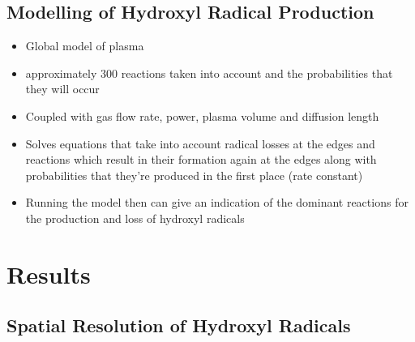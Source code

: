 \documentclass[11pt, oneside]{article}   	%
\begin{document}
\subsection{Modelling of Hydroxyl Radical Production}

\begin{itemize}
\item Global model of plasma
\item approximately 300 reactions taken into account and the probabilities that they will occur
\item Coupled with gas flow rate, power, plasma volume and diffusion length
\item Solves equations that take into account radical losses at the edges and reactions which result in their formation again at the edges along with probabilities that they're produced in the first place (rate constant)
\item Running the model then can give an indication of the dominant reactions for the production and loss of hydroxyl radicals
\end{itemize}



\section{Results}

\subsection{Spatial Resolution of Hydroxyl Radicals}
\end{document}
